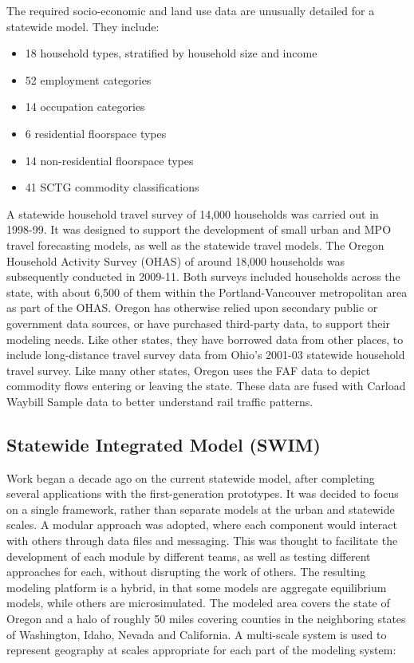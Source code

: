 The required socio-economic and land use data are unusually detailed for a statewide model. They include:
\begin{itemize}
\item 18 household types, stratified by household size and income
\item 52 employment categories
\item 14 occupation categories
\item 6 residential floorspace types
\item 14 non-residential floorspace types
\item 41 SCTG commodity classifications
\end{itemize}

A statewide household travel survey of 14,000 households was carried out in 1998-99. It was designed to support the development of small urban and MPO travel forecasting models, as well as the statewide travel models. The Oregon Household Activity Survey (OHAS) of around 18,000 households was subsequently conducted in 2009-11. Both surveys included households across the state, with about 6,500 of them within the Portland-Vancouver metropolitan area as part of the OHAS. Oregon has otherwise relied upon secondary public or government data sources, or have purchased third-party data, to support their modeling needs. Like other states, they have borrowed data from other places, to include long-distance travel survey data from Ohio's 2001-03 statewide household travel survey. Like many other states, Oregon uses the FAF data to depict commodity flows entering or leaving the state. These data are fused with Carload Waybill Sample data to better understand rail traffic patterns.

\subsection{Statewide Integrated Model (SWIM)}\label{sec:oregon-statewide-integrated-model}

Work began a decade ago on the current statewide model, after completing several applications with the first-generation prototypes. It was decided to focus on a single framework, rather than separate models at the urban and statewide scales. A modular approach was adopted, where each component would interact with others through data files and messaging. This was thought to facilitate the development of each module by different teams, as well as testing different approaches for each, without disrupting the work of others. The resulting modeling platform is a hybrid, in that some models are aggregate equilibrium models, while others are microsimulated. The modeled area covers the state of Oregon and a halo of roughly 50 miles covering counties in the neighboring states of Washington, Idaho, Nevada and California. A multi-scale system is used to represent geography at scales appropriate for each part of the modeling system:

